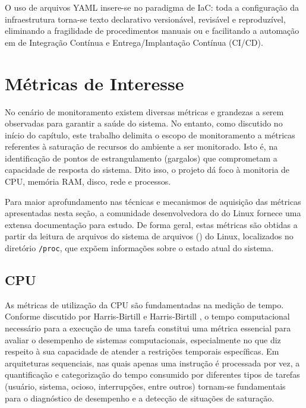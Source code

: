 O uso de arquivos YAML insere-se no paradigma de IaC: toda a configuração da infraestrutura torna-se texto declarativo versionável, revisável e reproduzível, eliminando a fragilidade de procedimentos manuais ou  e facilitando a automação em  de Integração Contínua e Entrega/Implantação Contínua (CI/CD).


\section{Métricas de Interesse}
\label{section:Metricas}

No cenário de monitoramento existem diversas métricas e grandezas a serem observadas para garantir a saúde do sistema. No entanto, como discutido no início do capítulo, este trabalho delimita o escopo de monitoramento a métricas referentes à saturação de recursos do ambiente a ser monitorado. Isto é, na identificação de pontos de estrangulamento (gargalos) que comprometam a capacidade de resposta do sistema. Dito isso, o projeto dá foco à monitoria de CPU, memória RAM, disco, rede e processos.

Para maior aprofundamento nas técnicas e mecanismos de aquisição das métricas apresentadas nesta seção, a comunidade desenvolvedora do  do Linux fornece uma extensa documentação \citep{linuxkernel2025} para estudo. {De forma geral, estas métricas são obtidas a partir da leitura de arquivos do sistema de arquivos () do Linux, localizados no diretório \verb|/proc|, que expõem informações sobre o estado atual do sistema.}

\subsection{CPU}
\label{subsection:CPU}

As métricas de utilização da CPU \citep{cpumetrics2025} são fundamentadas na medição de tempo. Conforme discutido por Harris-Birtill e Harris-Birtill \citep{harris-birtill2021}, o tempo computacional necessário para a execução de uma tarefa constitui uma métrica essencial para avaliar o desempenho de sistemas computacionais, especialmente no que diz respeito à sua capacidade de atender a restrições temporais específicas. Em arquiteturas sequenciais, nas quais apenas uma instrução é processada por vez, a quantificação e categorização do tempo consumido por diferentes tipos de tarefas (usuário, sistema, ocioso, interrupções, entre outros) tornam-se fundamentais para o diagnóstico de desempenho e a detecção de situações de saturação.

